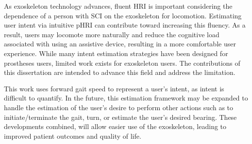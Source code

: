 As exoskeleton technology advances, fluent HRI is important considering the dependence of a person with SCI on the exoskeleton for locomotion. Estimating user intent via intuitive pHRI can contribute toward increasing this fluency. As a result, users may locomote more naturally and reduce the cognitive load associated with using an assistive device, resulting in a more comfortable user experience. While many intent estimation strategies have been designed for prostheses users, limited work exists for exoskeleton users. The contributions of this dissertation are intended to advance this field and address the limitation.

This work uses forward gait speed to represent a user's intent, as intent is difficult to quantify. In the future, this estimation framework may be expanded to handle the estimation of the user's desire to perform other actions such as to initiate/terminate the gait, turn, or estimate the user's desired bearing. These developments combined, will allow easier use of the exoskeleton, leading to improved patient outcomes and quality of life.